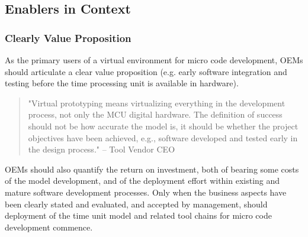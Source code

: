 \subsection{Enablers in Context}
\subsubsection*{Clearly Value Proposition}
As the primary users of a virtual environment for micro code development, OEMs should articulate a clear value proposition (e.g. early software integration and testing before the time processing unit is available in hardware).

\begin{quote}
"Virtual prototyping means virtualizing everything in the development process, not only the MCU digital hardware.
The definition of success should not be how accurate the model is, it should be whether the project objectives have been achieved, e.g., software developed and tested early in the design process."
-- Tool Vendor CEO
\end{quote}

OEMs should also quantify the return on investment, both of bearing some costs of the model development, and of the deployment effort within existing and mature software development processes.
Only when the business aspects have been clearly stated and evaluated, and accepted by management, should deployment of the time unit model and related tool chains for micro code development commence.




